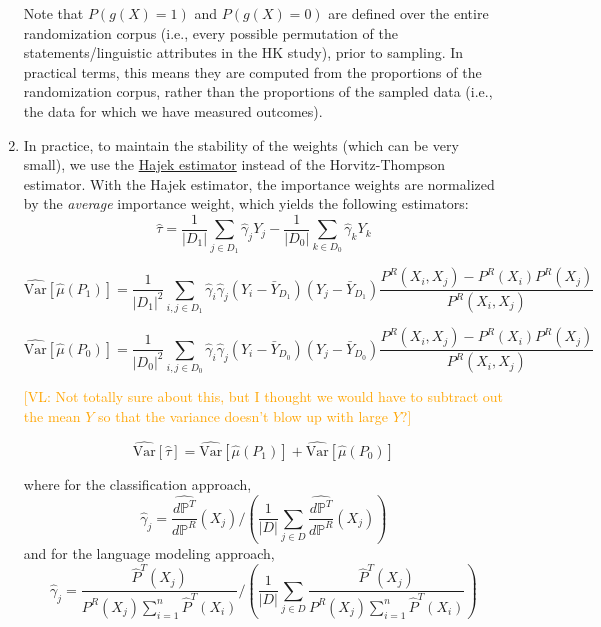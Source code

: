 \documentclass{article}
\newcommand{\vl}[1]{\textcolor{orange}{[VL: #1]}}
\begin{document}
\begin{enumerate}
    Note that $P(g(X)=1)$ and $P(g(X)=0)$ are defined over the entire randomization corpus (i.e., every possible permutation of the statements/linguistic attributes in the HK study), prior to sampling. In practical terms, this means they are computed from the  proportions of the randomization corpus, rather than the  proportions of the sampled data (i.e., the data for which we have measured outcomes).
    \item In practice, to maintain the stability of the weights (which can be very small), we use the \href{https://cran.r-project.org/web/packages/sampling/vignettes/HT_Hajek_estimators.pdf}{Hajek estimator} instead of the Horvitz-Thompson estimator. With the Hajek estimator, the importance weights are normalized by the \textit{average} importance weight, which yields the following estimators:
    \begin{equation*}
        \hat{\tau} = \frac{1}{|D_1|} \sum_{j \in D_1} \hat{\gamma}_j Y_j - \frac{1}{|D_0|} \sum_{k \in D_0} \hat{\gamma}_k Y_k
    \end{equation*}
    
    \begin{equation*}
        \widehat{\text{Var}}[\hat{\mu}(P_1)] = \frac{1}{|D_1|^2} \sum_{i,j \in D_1} \hat{\gamma}_i \hat{\gamma}_j (Y_i-\bar{Y}_{D_1})(Y_j-\bar{Y}_{D_1}) \frac{P^R(X_i,X_j)-P^R(X_i)P^R(X_j)}{P^R(X_i,X_j)}
    \end{equation*}
    
    \begin{equation*}
        \widehat{\text{Var}}[\hat{\mu}(P_0)] = \frac{1}{|D_0|^2} \sum_{i,j \in D_0} \hat{\gamma}_i \hat{\gamma}_j (Y_i-\bar{Y}_{D_0})(Y_j-\bar{Y}_{D_0}) \frac{P^R(X_i,X_j)-P^R(X_i)P^R(X_j)}{P^R(X_i,X_j)}
    \end{equation*}

    \vl{Not totally sure about this, but I thought we would have to subtract out the mean $Y$ so that the variance doesn't blow up with large $Y$?}
    
    \begin{equation*}
        \widehat{\text{Var}}[\hat{\tau}] = \widehat{\text{Var}}[\hat{\mu}(P_1)] + \widehat{\text{Var}}[\hat{\mu}(P_0)]
    \end{equation*}
    
    where for the classification approach,
    \begin{equation*}
        \hat{\gamma}_j = \frac{\hat{d \mathbb{P}^T}}{d \mathbb{P}^R}(X_j) \Bigg/ \left(\frac{1}{|D|} \sum_{j \in D} \frac{\hat{d \mathbb{P}^T}}{d \mathbb{P}^R}(X_j)\right)
    \end{equation*}
    and for the language modeling approach,
    \begin{equation*}
        \hat{\gamma}_j = \frac{\hat{P}^T(X_j)}{P^R(X_j)\sum_{i=1}^n \hat{P}^T(X_i)} \Bigg/ \left(\frac{1}{|D|} \sum_{j \in D} \frac{\hat{P}^T(X_j)}{P^R(X_j)\sum_{i=1}^n \hat{P}^T(X_i)} \right)
    \end{equation*}
\end{enumerate}
\end{document}
